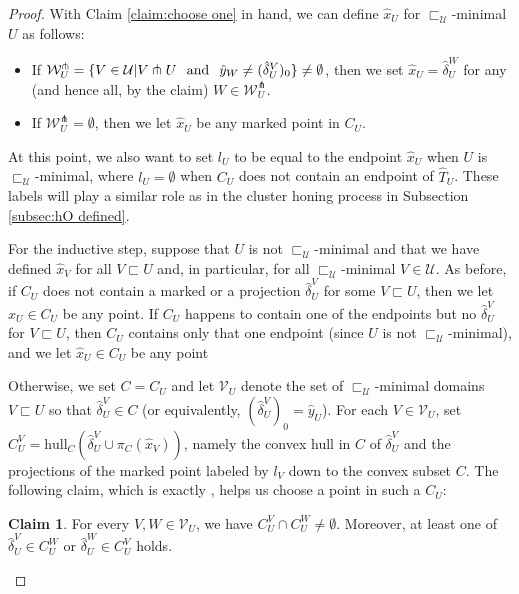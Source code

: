 \documentclass{amsart}
\theoremstyle{definition}
\newtheorem{claim}[theorem]{Claim}
\theoremstyle{remark}
\theoremstyle{definition}
\newcommand{\calU}{\mathcal{U}}
\newcommand{\calV}{\mathcal{V}}
\newcommand{\calW}{\mathcal{W}}
\newcommand{\hT}{\widehat{T}}
\newcommand{\hx}{\hat{x}}
\newcommand{\hy}{\hat{y}}
\newcommand{\hd}{\hat{\delta}}
\newcommand{\hull}{\mathrm{hull}}
\newcommand{\nest}{\sqsubset}
\begin{document}
\begin{proof}
With Claim \ref{claim:choose one} in hand, we can define $\hx_U$ for $\nest_{\calU}$-minimal $U$ as follows:

\begin{itemize}
\item If $\calW_U^{\pitchfork} = \{V \in \calU| V \pitchfork U \hspace{.1in} \mathrm{ and } \hspace{.1in} \hy_W \neq (\hd^V_U)_0\} \neq \emptyset$, then we set $\hx_U = \hd^W_U$ for any (and hence all, by the claim) $W \in \calW_U^{\pitchfork}$.
\item If $\calW_U^{\pitchfork} = \emptyset$, then we let $\hx_U$ be any marked point in $C_U$.
\end{itemize}

At this point, we also want to set $l_U$ to be equal to the endpoint $\hx_U$ when $U$ is $\nest_{\calU}$-minimal, where $l_U = \emptyset$ when $C_U$ does not contain an endpoint of $\hT_U$.  These labels will play a similar role as in the cluster honing process in Subsection \ref{subsec:hO defined}.

For the inductive step, suppose that $U$ is not $\nest_{\calU}$-minimal and that we have defined $\hx_V$ for all $V \nest U$ and, in particular, for all $\nest_{\calU}$-minimal $V \in \calU$.  As before, if $C_U$ does not contain a marked or a projection $\hd^V_U$ for some $V \nest U$, then we let $\hx_U \in C_U$ be any point.  If $C_U$ happens to contain one of the endpoints but no $\hd^V_U$ for $V \nest U$, then $C_U$ contains only that one endpoint (since $U$ is not $\nest_{\calU}$-minimal), and we let $\hx_U \in C_U$ be any point

Otherwise, we set $C=C_U$ and let $\calV_U$ denote the set of $\nest_{\calU}$-minimal domains $V \nest U$ so that $\hd^V_U \in C$ (or equivalently, $(\hd^V_U)_0 = \hy_U$).  For each $V \in \calV_U$, set $C^V_U = \hull_C(\hd^V_U \cup \pi_C(\hx_V))$, namely the convex hull in $C$ of $\hd^V_U$ and the projections of the marked point labeled by $l_V$ down to the convex subset $C$.  The following claim, which is exactly \cite[Claim 10.4]{Dur_infcube}, helps us choose a point in such a $C_U$:

\begin{claim}\label{claim:cluster overlap}
For every $V, W \in \calV_U$, we have $C^V_U \cap C^W_U \neq \emptyset$.  Moreover, at least one of $\hd^V_U \in C^W_U$ or $\hd^W_U \in C^V_U$ holds.


\end{claim}


\end{proof}
\end{document}
